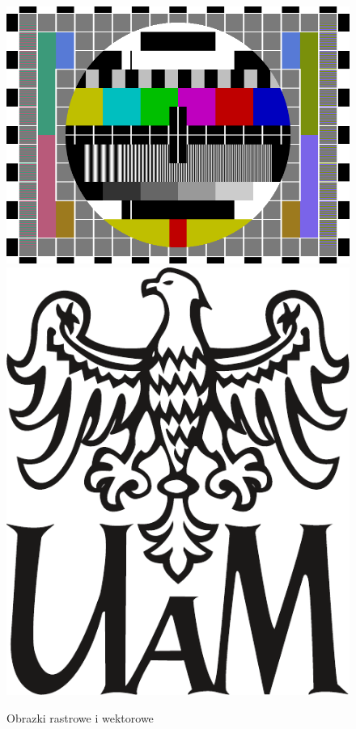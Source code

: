 \documentclass[12pt,a4paper,leqno,oneside,titlepage]{book}
\begin{document}
\begin{figure}[h!]
  \centering
    \includegraphics[height=0.3\textheight]{PM5544_with_non-PAL_signals.png}
    \includegraphics[height=0.3\textheight]{logo_wersja-uzupeniajca_czarny_2.pdf}
  \caption{Obrazki rastrowe i wektorowe}
\end{figure}
\end{document}
